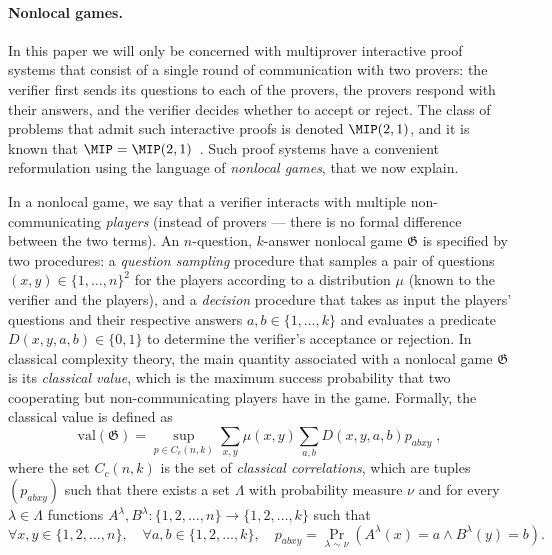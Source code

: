 \documentclass[11pt]{article}
\theoremstyle{definition}
\newcommand{\val}{\ensuremath{\mathrm{val}}}
\newcommand{\game}{\mathfrak{G}}
\begin{document}
\paragraph{Nonlocal games.}
In this paper we will only be concerned with multiprover interactive proof systems that consist of a single round of communication with two provers: the verifier first sends its questions to each of the provers, the provers respond with their answers, and the verifier decides whether to accept or reject. The class of problems that admit such interactive proofs is denoted $\MIP(2,1)$, and it is known that $\MIP=\MIP(2,1)$~\cite{feige1992two}. Such proof systems have a convenient reformulation using the language of \emph{nonlocal games}, that we now explain. 

In a nonlocal game, we say that a verifier interacts with multiple non-communicating \emph{players} (instead of provers --- there is no formal difference between the two terms). An $n$-question, $k$-answer nonlocal game $\game$ is specified by two procedures: a \emph{question sampling} procedure that samples a pair of questions $(x,y)\in \{1,\ldots,n\}^2$ for the players according to a distribution $\mu$ (known to the verifier and the players), and a \emph{decision} procedure that takes as input the players' questions and their respective answers $a,b\in\{1,\ldots,k\}$ and evaluates a predicate $D(x,y,a,b)\in \{0,1\}$ to determine the verifier's acceptance or rejection. In classical complexity theory, the main quantity associated with a nonlocal game $\game$ is its \emph{classical value}, which is the maximum success probability that two cooperating but non-communicating players have in the game. Formally, the classical value is defined as
\begin{equation}\label{eq:class-val}
 \val(\game) = \sup_{p\in C_c(n,k)} \sum_{x,y} \mu(x,y) \sum_{a,b} D(x,y,a,b) p_{abxy}\;,
\end{equation}
where the set $C_c(n,k)$ is the set of \emph{classical correlations}, which are tuples $(p_{abxy})$ such that there exists a set $\Lambda$ with probability measure $\nu$ and for every $\lambda \in \Lambda$ functions $A^\lambda,B^\lambda: \{1,2,\ldots,n\} \to \{1,2,\ldots,k\}$ such that
\[
	\forall x,y \in \{1,2,\ldots,n\}, \quad \forall a,b \in \{1,2,\ldots,k\}, \quad p_{abxy} = \Pr_{\lambda \sim \nu} (A^\lambda(x) = a \wedge B^\lambda(y) = b).
\]
\end{document}
